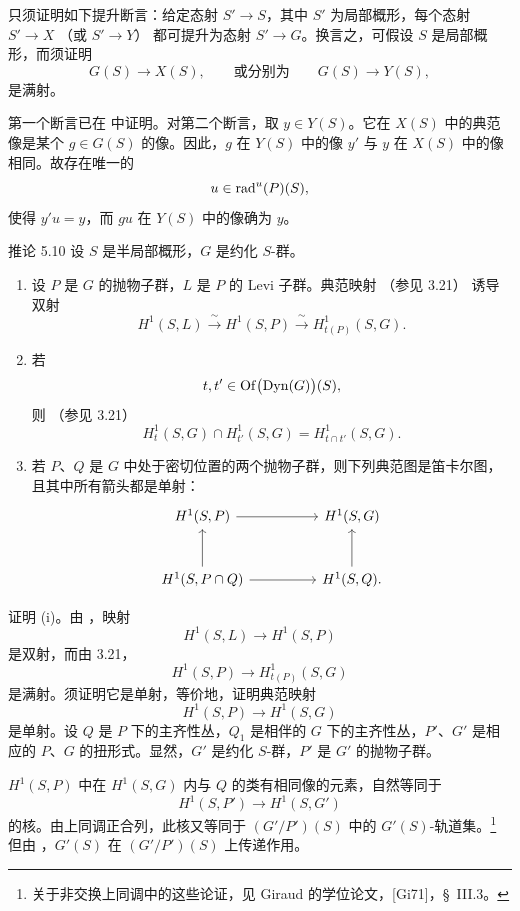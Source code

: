 只须证明如下提升断言：给定态射 \(S'\to S\)，其中 \(S'\) 为局部概形，每个态射 \(S'\to X\) \textup{（或 \(S'\to Y\)）} 都可提升为态射 \(S'\to G\)。换言之，可假设 \(S\) 是局部概形，而须证明
\[
 G(S)\longrightarrow X(S),
 \qquad\text{或分别为}\qquad
 G(S)\longrightarrow Y(S),
\]
是满射。

第一个断言已在  中证明。对第二个断言，取 \(y\in Y(S)\)。它在 \(X(S)\) 中的典范像是某个 \(g\in G(S)\) 的像。因此，\(g\) 在 \(Y(S)\) 中的像 \(y'\) 与 \(y\) 在 \(X(S)\) 中的像相同。故存在唯一的
\[
 u\in\operatorname{rad}^u(P)(S),
\]
使得 \(y'u=y\)，而 \(gu\) 在 \(Y(S)\) 中的像确为 \(y\)。

\begin{sgastatement}{推论 5.10}
设 \(S\) 是半局部概形，\(G\) 是约化 \(S\)-群。
\begin{enumerate}[label=\textup{(\roman*)}]
\item 设 \(P\) 是 \(G\) 的抛物子群，\(L\) 是 \(P\) 的 Levi 子群。典范映射 \textup{（参见 3.21）} 诱导双射
\[
 H^1(S,L)\xrightarrow{\ \sim\ }H^1(S,P)
       \xrightarrow{\ \sim\ }H^1_{t(P)}(S,G).
\]
\item 若
\[
 t,t'\in\operatorname{Of}\bigl(\operatorname{Dyn}(G)\bigr)(S),
\]
则 \textup{（参见 3.21）}
\[
 H^1_t(S,G)\cap H^1_{t'}(S,G)=H^1_{t\cap t'}(S,G).
\]
\item 若 \(P\)、\(Q\) 是 \(G\) 中处于密切位置的两个抛物子群，则下列典范图是笛卡尔图，且其中所有箭头都是单射：
\[
\begin{tikzcd}[column sep=huge,row sep=large]
 H^1(S,P) \arrow[r] & H^1(S,G)\\
 H^1(S,P\cap Q) \arrow[u] \arrow[r] & H^1(S,Q). \arrow[u]
\end{tikzcd}
\]
\end{enumerate}
\end{sgastatement}

证明 \textup{(i)}。由 ，映射
\[
 H^1(S,L)\longrightarrow H^1(S,P)
\]
是双射，而由 3.21，
\[
 H^1(S,P)\longrightarrow H^1_{t(P)}(S,G)
\]
是满射。须证明它是单射，等价地，证明典范映射
\[
 H^1(S,P)\longrightarrow H^1(S,G)
\]
是单射。设 \(Q\) 是 \(P\) 下的主齐性丛，\(Q_1\) 是相伴的 \(G\) 下的主齐性丛，\(P'\)、\(G'\) 是相应的 \(P\)、\(G\) 的扭形式。显然，\(G'\) 是约化 \(S\)-群，\(P'\) 是 \(G'\) 的抛物子群。

\(H^1(S,P)\) 中在 \(H^1(S,G)\) 内与 \(Q\) 的类有相同像的元素，自然等同于
\[
 H^1(S,P')\longrightarrow H^1(S,G')
\]
的核。由上同调正合列，此核又等同于 \((G'/P')(S)\) 中的 \(G'(S)\)-轨道集。\footnote{关于非交换上同调中的这些论证，见 Giraud 的学位论文，\textup{[Gi71]}，\S~III.3。}
但由 ，\(G'(S)\) 在 \((G'/P')(S)\) 上传递作用。

